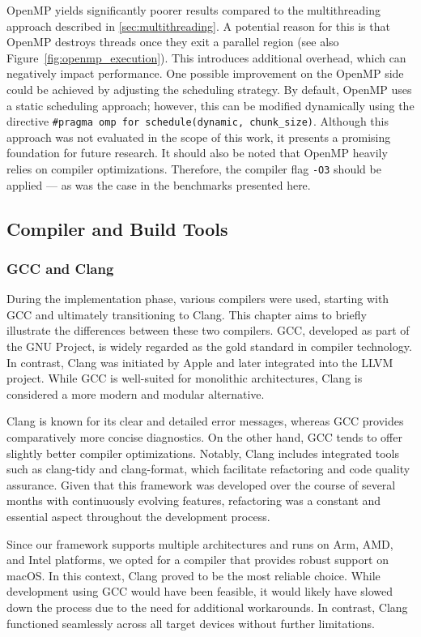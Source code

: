 \documentclass[modern,longauthor]{aastex7}
\begin{document}
OpenMP yields significantly poorer results compared to the multithreading approach described in \autoref{sec:multithreading}. A potential reason for this is that OpenMP destroys threads once they exit a parallel region (see also Figure~\ref{fig:openmp_execution}). This introduces additional overhead, which can negatively impact performance.
One possible improvement on the OpenMP side could be achieved by adjusting the scheduling strategy. By default, OpenMP uses a static scheduling approach; however, this can be modified dynamically using the directive \texttt{\#pragma omp for schedule(dynamic, chunk\_size)}. Although this approach was not evaluated in the scope of this work, it presents a promising foundation for future research.
It should also be noted that OpenMP heavily relies on compiler optimizations. Therefore, the compiler flag \texttt{-O3} should be applied — as was the case in the benchmarks presented here.
\subsection{Compiler and Build Tools}
\subsubsection{GCC and Clang}\label{subsec:gcc-and-clang}
During the implementation phase, various compilers were used, starting with GCC and ultimately transitioning to Clang. This chapter aims to briefly illustrate the differences between these two compilers. GCC, developed as part of the GNU Project, is widely regarded as the gold standard in compiler technology. In contrast, Clang was initiated by Apple and later integrated into the LLVM project. While GCC is well-suited for monolithic architectures, Clang is considered a more modern and modular alternative.

Clang is known for its clear and detailed error messages, whereas GCC provides comparatively more concise diagnostics. On the other hand, GCC tends to offer slightly better compiler optimizations. Notably, Clang includes integrated tools such as clang-tidy and clang-format, which facilitate refactoring and code quality assurance. Given that this framework was developed over the course of several months with continuously evolving features, refactoring was a constant and essential aspect throughout the development process.

Since our framework supports multiple architectures and runs on Arm, AMD, and Intel platforms, we opted for a compiler that provides robust support on macOS. In this context, Clang proved to be the most reliable choice. While development using GCC would have been feasible, it would likely have slowed down the process due to the need for additional workarounds. In contrast, Clang functioned seamlessly across all target devices without further limitations.
\end{document}
